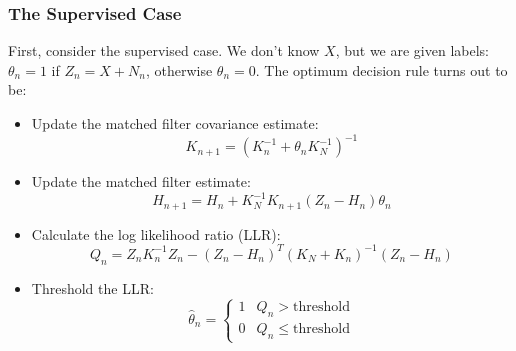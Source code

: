 \documentclass{beamer}
\begin{document}
\begin{frame}
  \frametitle{The Supervised Case}

  First, consider the supervised case.  We don't know $X$, but we are
  given labels: $\theta_n=1$ if  $Z_n=X+N_n$, otherwise $\theta_n=0$.
  The optimum decision rule turns out to be:
  \begin{itemize}
  \item Update the matched filter covariance estimate:
    \begin{displaymath}
      K_{n+1} = \left(K_n^{-1}+\theta_n K_N^{-1}\right)^{-1}
    \end{displaymath}
  \item Update the matched filter estimate:
    \begin{displaymath}
      H_{n+1} = H_n + K_N^{-1}K_{n+1}(Z_n-H_n)\theta_n
    \end{displaymath}
  \item Calculate the log likelihood ratio (LLR):
    \begin{displaymath}
      Q_n = Z_nK_n^{-1}Z_n -
      (Z_n-H_n)^T(K_N+K_n)^{-1}(Z_n-H_n)
    \end{displaymath}
  \item Threshold the LLR:
    \begin{displaymath}
      \hat\theta_n = \left\{\begin{array}{ll}
      1 & Q_n > \text{threshold}\\
      0 & Q_n \le \text{threshold}
      \end{array}\right.
    \end{displaymath}
  \end{itemize}
\end{frame}
\end{document}
